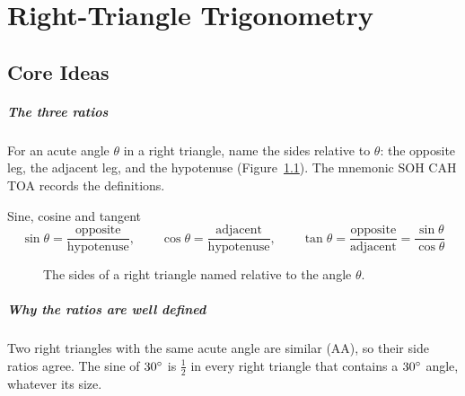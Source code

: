 \chapter{Right-Triangle Trigonometry}


\section{Core Ideas}

\paragraph{The three ratios} For an acute angle $\theta$ in a right triangle, name the sides relative to $\theta$: the opposite leg, the adjacent leg, and the hypotenuse (Figure~\ref{fig:soh}). The mnemonic SOH CAH TOA records the definitions.

\begin{keybox}{Sine, cosine and tangent}
\[
\sin\theta = \frac{\text{opposite}}{\text{hypotenuse}}, \qquad
\cos\theta = \frac{\text{adjacent}}{\text{hypotenuse}}, \qquad
\tan\theta = \frac{\text{opposite}}{\text{adjacent}} = \frac{\sin\theta}{\cos\theta}
\]
\end{keybox}

\begin{figure}[H]
\centering
{}
\caption{The sides of a right triangle named relative to the angle $\theta$.}
\label{fig:soh}
\end{figure}

\paragraph{Why the ratios are well defined} Two right triangles with the same acute angle are similar (AA), so their side ratios agree. The sine of $30^\circ$ is $\tfrac{1}{2}$ in every right triangle that contains a $30^\circ$ angle, whatever its size.

